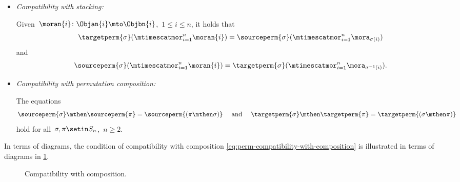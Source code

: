 \begin{ctdefinition}
\begin{itemize}
        \item \emph{Compatibility with stacking:}

              Given~$\moran{i} \colon \Objan{i} \mto \Objbn{i}$,~$1 \leq i \leq n$, it holds that
              \begin{equation}
                  \label{eq:perm-compatibility-with-stacking-1}
                  \targetperm{\sigma} ( \mtimescatmor_{i=1}^n \moran{i} ) = \sourceperm{\sigma}(  \mtimescatmor_{i=1}^n \mora_{\sigma(i)} )
              \end{equation}
              and
              \begin{equation}
                  \label{eq:perm-compatibility-with-stacking-2}
                  \sourceperm{\sigma} ( \mtimescatmor_{i=1}^n \moran{i} ) = \targetperm{\sigma} (  \mtimescatmor_{i=1}^n \mora_{\sigma^{-1}(i)} ).
              \end{equation}

        \item \emph{Compatibility with permutation composition:}

              The equations
              \begin{equation}
                  \label{eq:perm-compatibility-with-perm-comp}
                  \sourceperm{\sigma} \mthen \sourceperm{\pi} = \sourceperm{(\pi\mthen\sigma)}
                  \quad \text{ and } \quad
                  \targetperm{\sigma} \mthen \targetperm{\pi} = \targetperm{(\sigma \mthen \pi)}
              \end{equation}
              hold for all~$\sigma, \pi \setin S_n$,~$n \geq 2$.

    \end{itemize}
\end{ctdefinition}


In terms of diagrams, the condition of compatibility with composition \cref{eq:perm-compatibility-with-composition} is illustrated in terms of diagrams in \cref{fig:symmetric-stacking-comp-compat}.

\begin{figure}[h]
    \centering
     \qquad \qquad
    \caption{Compatibility with composition. }
    \label{fig:symmetric-stacking-comp-compat}
\end{figure}


